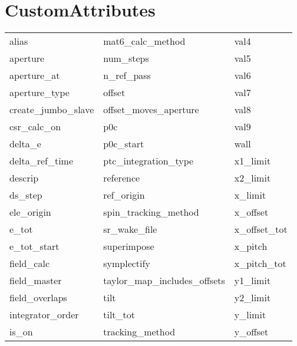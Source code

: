  \section{CustomAttributes}
 \label{s:list.custom}
 
 \begin{tabular}{lll} \toprule
alias                       & mat6_calc_method            & val4                        \\
aperture                    & num_steps                   & val5                        \\
aperture_at                 & n_ref_pass                  & val6                        \\
aperture_type               & offset                      & val7                        \\
create_jumbo_slave          & offset_moves_aperture       & val8                        \\
csr_calc_on                 & p0c                         & val9                        \\
delta_e                     & p0c_start                   & wall                        \\
delta_ref_time              & ptc_integration_type        & x1_limit                    \\
descrip                     & reference                   & x2_limit                    \\
ds_step                     & ref_origin                  & x_limit                     \\
ele_origin                  & spin_tracking_method        & x_offset                    \\
e_tot                       & sr_wake_file                & x_offset_tot                \\
e_tot_start                 & superimpose                 & x_pitch                     \\
field_calc                  & symplectify                 & x_pitch_tot                 \\
field_master                & taylor_map_includes_offsets & y1_limit                    \\
field_overlaps              & tilt                        & y2_limit                    \\
integrator_order            & tilt_tot                    & y_limit                     \\
is_on                       & tracking_method             & y_offset                    \\

\end{tabular}
